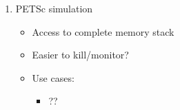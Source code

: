 \documentclass{article}
\begin{document}
\begin{enumerate}
\begin{itemize}
\begin{itemize}
          \item ??
        \end{itemize}
    \end{itemize}
  \item PETSc simulation 
    \begin{itemize}
      \item Access to complete memory stack
      \item Easier to kill/monitor?
      \item Use cases: 
        \begin{itemize}
          \item ??
        \end{itemize}
    \end{itemize}
\end{enumerate}



% 
% 
\end{document}
